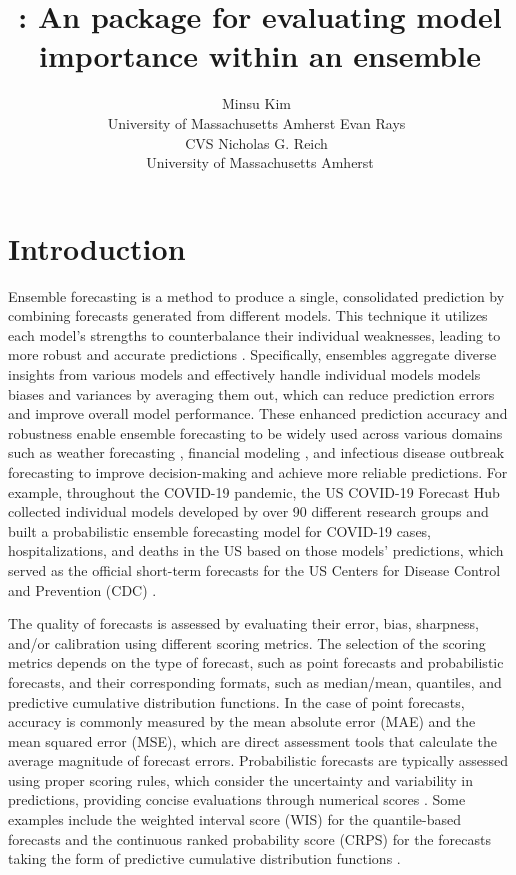 \documentclass[
  article,
  shortnames,
  notitle]{jss}
\author{Minsu Kim~\orcidlink{0009-0008-4637-3589}\\University of
Massachusetts Amherst \And Evan
Rays~\orcidlink{0000-0003-4035-0243}\\CVS \AND Nicholas G.
Reich~\orcidlink{0000-0003-3503-9899}\\University of Massachusetts
Amherst}
\title{\pkg{modelimportance}: An \proglang{R} package for evaluating
model importance within an ensemble}
\begin{document}
\maketitle


\section{Introduction}\label{sec:intro}

Ensemble forecasting is a method to produce a single, consolidated
prediction by combining forecasts generated from different models. This
technique it utilizes each model's strengths to counterbalance their
individual weaknesses, leading to more robust and accurate predictions
\citep{gneiting2005weather, hastie01statisticallearning, lutz_applying_2019, viboud_rapidd_2018}.
Specifically, ensembles aggregate diverse insights from various models
and effectively handle individual models models biases and variances by
averaging them out, which can reduce prediction errors and improve
overall model performance. These enhanced prediction accuracy and
robustness enable ensemble forecasting to be widely used across various
domains such as weather forecasting
\citep{Guerra_2020, gneiting2005weather}, financial modeling
\citep{SUN2020101160, math11041054}, and infectious disease outbreak
forecasting \citep{ray_prediction_2018, reich_accuracy_2019} to improve
decision-making and achieve more reliable predictions. For example,
throughout the COVID-19 pandemic, the US COVID-19 Forecast Hub collected
individual models developed by over 90 different research groups and
built a probabilistic ensemble forecasting model for COVID-19 cases,
hospitalizations, and deaths in the US based on those models'
predictions, which served as the official short-term forecasts for the
US Centers for Disease Control and Prevention (CDC) \citep{kim2024}.

The quality of forecasts is assessed by evaluating their error, bias,
sharpness, and/or calibration using different scoring metrics. The
selection of the scoring metrics depends on the type of forecast, such
as point forecasts and probabilistic forecasts, and their corresponding
formats, such as median/mean, quantiles, and predictive cumulative
distribution functions. In the case of point forecasts, accuracy is
commonly measured by the mean absolute error (MAE) and the mean squared
error (MSE), which are direct assessment tools that calculate the
average magnitude of forecast errors. Probabilistic forecasts are
typically assessed using proper scoring rules, which consider the
uncertainty and variability in predictions, providing concise
evaluations through numerical scores \citep{gneiting_strictly_2007}.
Some examples include the weighted interval score (WIS) for the
quantile-based forecasts and the continuous ranked probability score
(CRPS) for the forecasts taking the form of predictive cumulative
distribution functions \citep{bracher_evaluating_2021}.
\end{document}
